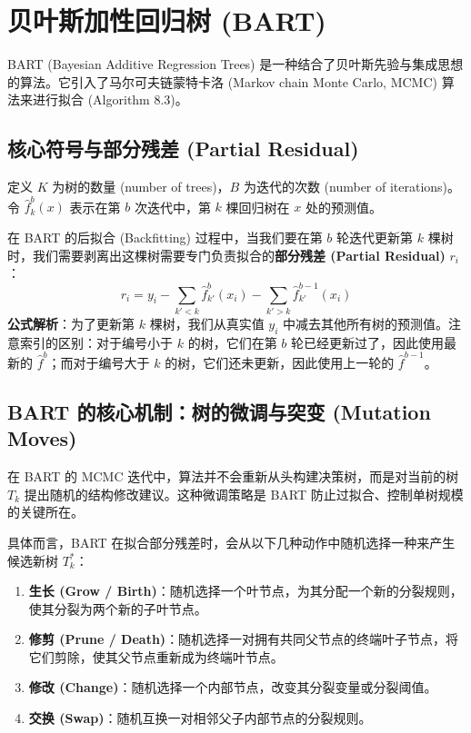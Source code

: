 \documentclass[UTF8]{ctexart}
\numberwithin{equation}{section}
\begin{document}
\section{贝叶斯加性回归树 (BART)}
BART (Bayesian Additive Regression Trees) 是一种结合了贝叶斯先验与集成思想的算法。它引入了马尔可夫链蒙特卡洛 (Markov chain Monte Carlo, MCMC) 算法来进行拟合 (Algorithm 8.3)。

\subsection{核心符号与部分残差 (Partial Residual)}
定义 $K$ 为树的数量 (number of trees)，$B$ 为迭代的次数 (number of iterations)。
令 $\hat{f}_k^b(x)$ 表示在第 $b$ 次迭代中，第 $k$ 棵回归树在 $x$ 处的预测值。

在 BART 的后拟合 (Backfitting) 过程中，当我们要在第 $b$ 轮迭代更新第 $k$ 棵树时，我们需要剥离出这棵树需要专门负责拟合的\textbf{部分残差 (Partial Residual)} $r_i$：
\begin{equation}
    r_i = y_i - \sum_{k'<k} \hat{f}_{k'}^b(x_i) - \sum_{k'>k} \hat{f}_{k'}^{b-1}(x_i)
\end{equation}
\textbf{公式解析}：为了更新第 $k$ 棵树，我们从真实值 $y_i$ 中减去其他所有树的预测值。注意索引的区别：对于编号小于 $k$ 的树，它们在第 $b$ 轮已经更新过了，因此使用最新的 $\hat{f}^b$；而对于编号大于 $k$ 的树，它们还未更新，因此使用上一轮的 $\hat{f}^{b-1}$。


\subsection{BART 的核心机制：树的微调与突变 (Mutation Moves)}
在 BART 的 MCMC 迭代中，算法并不会重新从头构建决策树，而是对当前的树 $T_k$ 提出随机的结构修改建议。这种微调策略是 BART 防止过拟合、控制单树规模的关键所在。

具体而言，BART 在拟合部分残差时，会从以下几种动作中随机选择一种来产生候选新树 $T_k^*$：
\begin{enumerate}
    \item \textbf{生长 (Grow / Birth)}：随机选择一个叶节点，为其分配一个新的分裂规则，使其分裂为两个新的子叶节点。
    \item \textbf{修剪 (Prune / Death)}：随机选择一对拥有共同父节点的终端叶子节点，将它们剪除，使其父节点重新成为终端叶节点。
    \item \textbf{修改 (Change)}：随机选择一个内部节点，改变其分裂变量或分裂阈值。
    \item \textbf{交换 (Swap)}：随机互换一对相邻父子内部节点的分裂规则。
\end{enumerate}
\end{document}

